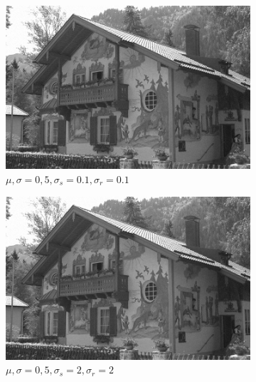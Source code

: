 \documentclass[a4paper, landscape]{article}
\begin{document}
\begin{figure}
    \centering
    \begin{subfigure}{0.33\linewidth}
        \centering
        \includegraphics[width=\linewidth]{kodak24,σ_noise5,σ_spatial0.1,σ_range0.1.png}
        \caption{$\mu, \sigma = 0, 5, \sigma_s=0.1, \sigma_r=0.1$}
    \end{subfigure}
    \begin{subfigure}{0.33\linewidth}
        \centering
        \includegraphics[width=\linewidth]{kodak24,σ_noise5,σ_spatial2,σ_range2.png}
        \caption{$\mu, \sigma = 0, 5, \sigma_s=2, \sigma_r=2$}
    \end{subfigure}
    \begin{subfigure}{0.33\linewidth}
        \centering

\end{subfigure}
\end{figure}
\end{document}
